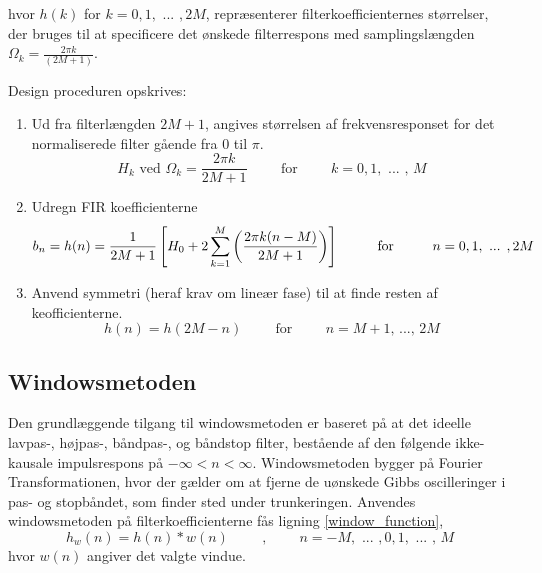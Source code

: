 hvor $h(k)$ for $k=0,1,\text{ ... },2M$, repræsenterer filterkoefficienternes størrelser, der bruges til at specificere det ønskede filterrespons med samplingslængden $\Omega_{k}=\frac{2\pi k}{(2M+1)}$.

Design proceduren opskrives:
\begin{enumerate}
\item Ud fra filterlængden $2M+1$, angives størrelsen af frekvensresponset for det normaliserede filter gående fra $0$ til $\pi$.
\begin{equation}
	H_k \text{ ved } \Omega_{k} = \frac{2 \pi k}{2M+1} \hspace{1cm} \text{for} \hspace{1cm} k=0,1,\text{ ... , } M
\end{equation}
\item Udregn FIR koefficienterne
\begin{equation}
b_n = h(n)=\frac{1}{2M+1}\left[ H_{0}+2\sum_{k=1}^{M} \left( \frac{2\pi k(n-M)}{2M+1} \right) \right] \hspace{1cm} \text{for} \hspace{1 cm} n=0,1,\text{ ... },2M
\end{equation}
\item Anvend symmetri (heraf krav om lineær fase) til at finde resten af keofficienterne.
\begin{equation}
	h(n) = h(2M-n) \hspace{1cm} \text{for} \hspace{1cm} n=M+1 \text{, ..., } 2M
\end{equation}
\end{enumerate}

\subsection{Windowsmetoden}
Den grundlæggende tilgang til windowsmetoden er baseret på at det ideelle lavpas-, højpas-, båndpas-, og båndstop filter, bestående af den følgende ikke-kausale impulsrespons på $-\infty < n < \infty$. Windowsmetoden bygger på Fourier Transformationen, hvor der gælder om at fjerne de uønskede Gibbs oscilleringer i pas- og stopbåndet, som finder sted under trunkeringen. Anvendes windowsmetoden på filterkoefficienterne fås ligning \ref{window_function},
\begin{equation}
	h_w(n) = h(n)*w(n) \hspace{1cm}\text{,} \hspace{1cm}n=-M,\text{ ... },0, 1,\text{ ... , }M	
	\label{window_function}
\end{equation}
hvor $w(n)$ angiver det valgte vindue.

